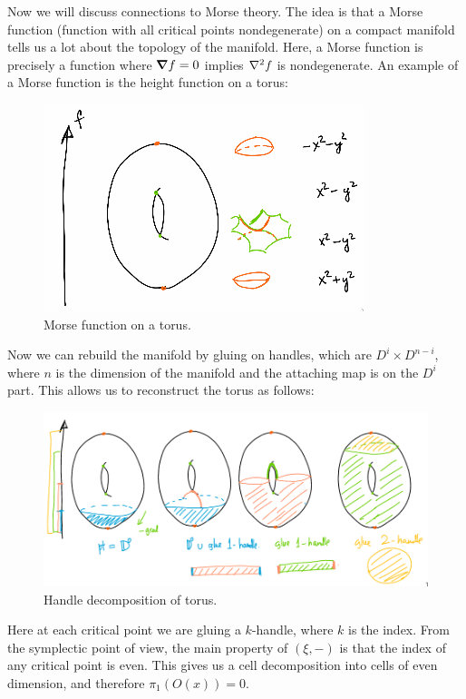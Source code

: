 \documentclass[leqno, openany]{memoir}
\theoremstyle{definition}
\theoremstyle{remark}
\theoremstyle{plain}
\theoremstyle{definition}
\theoremstyle{remark}
\begin{document}
Now we will discuss connections to Morse theory. The idea is that a Morse function (function with all critical points nondegenerate) on a compact manifold tells us a lot about the topology of the manifold. Here, a Morse function is precisely a function where $\grad f = 0$ implies $\laplacian f$ is nondegenerate. An example of a Morse function is the height function on a torus:
\begin{figure}[H]
    \centering
    \includegraphics[scale=0.8]{morse.png}
    \caption{Morse function on a torus.}%
    \label{fig:morse}
\end{figure}
Now we can rebuild the manifold by gluing on handles, which are $D^i \times D^{n-i}$, where $n$ is the dimension of the manifold and the attaching map is on the $D^{i}$ part. This allows us to reconstruct the torus as follows:
\begin{figure}[H]
    \centering
    \includegraphics[scale=0.4]{morse2.png}
    \caption{Handle decomposition of torus.}%
    \label{fig:morse2}
\end{figure}
Here at each critical point we are gluing a $k$-handle, where $k$ is the index. From the symplectic point of view, the main property of $(\xi, -)$ is that the index of any critical point is even. This gives us a cell decomposition into cells of even dimension, and therefore $\pi_1(O(x)) = 0$.
\end{document}
